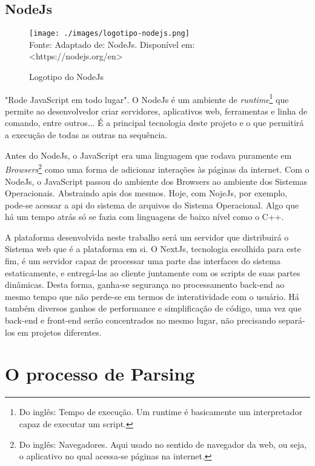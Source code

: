 \subsection{NodeJs}

\begin{figure}[H]
    \centering
    \caption{Logotipo do NodeJs}
    \texttt{[image: ./images/logotipo-nodejs.png]}
    \label{fig:logotipo-nodejs} \\
    \textnormal{\fontsize{10pt}{12pt}Fonte: Adaptado de: NodeJs. Disponível em: <https://nodejs.org/en>}
\end{figure}

"Rode JavaScript em todo lugar".
O NodeJs é um ambiente de
\textit{runtime}\footnote{Do inglês: Tempo de execução. Um runtime é basicamente um interpretador
    capaz de executar um script.
}
que permite ao desenvolvedor criar servidores, aplicativos
\acrshort{web},
ferramentas e linha de comando, entre outros...
É a principal tecnologia deste projeto e o que permitirá
a execução de todas as outras na sequência.

Antes do NodeJs, o JavaScript era uma linguagem que
rodava puramente em
\textit{Browsers}\footnote{Do inglês: Navegadores. Aqui usado no sentido de
    navegador da \acrshort{web}, ou seja,
    o aplicativo no qual acessa-se páginas na internet.
}
como uma forma de adicionar interações às páginas da internet.
Com o NodeJs, o JavaScript passou do ambiente dos Browsers
ao ambiente dos Sistemas Operacionais. Abstraindo
\acrshort{api}s
dos mesmos. Hoje, com NojeJs, por exemplo, pode-se
acessar a
\acrshort{api}
do sistema de arquivos do Sistema Operacional.
Algo que há um tempo atrás só se fazia com
linguagens de baixo nível como o C++.

A plataforma desenvolvida neste trabalho será
um servidor que distribuirá o Sistema
\acrshort{web}
que é a plataforma em si. O NextJs,
tecnologia escolhida para este fim,
é um servidor capaz de processar uma parte
das interfaces do sistema estaticamente, e
entregá-las ao cliente juntamente com os scripts
de suas partes dinâmicas. Desta forma,
ganha-se segurança no processamento back-end
ao mesmo tempo que não perde-se em termos de
interatividade com o usuário.
Há também diversos ganhos de performance e simplificação
de código, uma vez que back-end e front-end
serão concentrados no mesmo lugar, não precisando
separá-los em projetos diferentes.

\section{O processo de Parsing}

